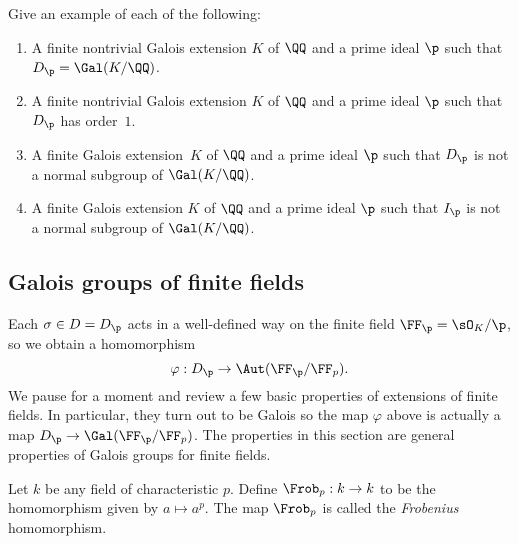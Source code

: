 \begin{exercise}
  Give an example of each of the following:
  \begin{enumerate}[label=(\alph*)]
    \item A finite nontrivial Galois extension $K$
          of $\QQ$ and a prime ideal $\p$ such that $D_\p = \Gal(K/\QQ)$.
    \item A finite nontrivial Galois extension $K$ of
          $\QQ$ and a prime ideal $\p$ such that $D_\p$ has order~$1$.
    \item A finite Galois extension~$K$ of
          $\QQ$ and a prime ideal $\p$ such that $D_\p$ is not a normal
          subgroup of $\Gal(K/\QQ)$.
    \item A finite Galois extension $K$ of
          $\QQ$ and a prime ideal $\p$ such that $I_\p$ is not a normal
          subgroup of $\Gal(K/\QQ)$.
  \end{enumerate}
\end{exercise}

\subsection{Galois groups of finite fields}\label{sec:galoisfinite}

Each $\sigma \in D = D_\p$ acts in a well-defined
way on the finite field $\FF_\p = \sO_K/\p$, so we obtain
a homomorphism
\[
  \varphi: D_\p \to \Aut(\FF_\p/\FF_p).
\]
We pause for a moment and review a few basic properties of
extensions of finite fields. In particular, they turn out
to be Galois so the map $\varphi$ above is actually a map
$D_\p \to \Gal(\FF_\p/\FF_p)$.
The properties in this section are general properties
of Galois groups for finite fields.

\begin{definition}
  Let $k$ be any field of characteristic $p$.
  Define $\Frob_p: k \to k$ to be the homomorphism
  given by $a\mapsto a^p$. The map $\Frob_p$ is
  called the \emph{Frobenius} homomorphism.
\end{definition}

